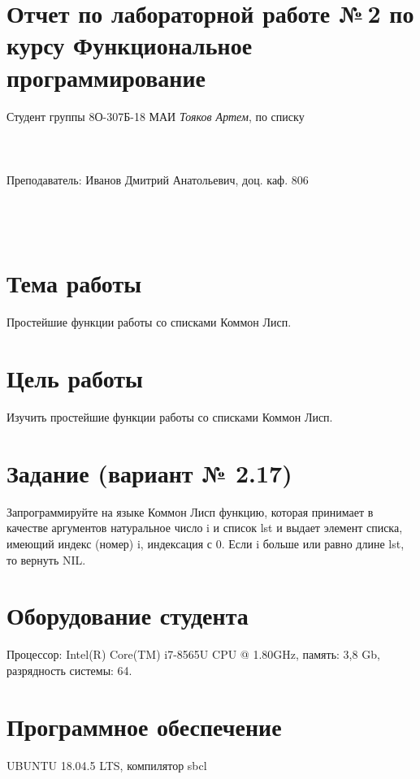 \documentclass[12pt]{article}
\begin{document}
\section*{Отчет по лабораторной работе №\,2 
по курсу \guillemotleft  Функциональное программирование\guillemotright}
\begin{flushright}
Студент группы 8О-307Б-18 МАИ \textit{Тояков Артем},  по списку \\
 \\
 \\
\ \\
Преподаватель: Иванов Дмитрий Анатольевич, доц. каф. 806 \\
 \\
 \\
 \\

\end{flushright}

\section{Тема работы}
Простейшие функции работы со списками Коммон Лисп.

\section{Цель работы}
Изучить  простейшие функции работы со списками Коммон Лисп.

\section{Задание (вариант № 2.17)}
Запрограммируйте на языке Коммон Лисп функцию, которая принимает в качестве аргументов натуральное число i и список lst и выдает элемент списка, имеющий индекс (номер) i, индексация с 0. Если i больше или равно длине lst, то вернуть NIL.

\section{Оборудование студента}
Процессор: Intel(R) Core(TM) i7-8565U CPU @ 1.80GHz, память: 3,8 Gb, разрядность системы: 64.

\section{Программное обеспечение}
UBUNTU 18.04.5 LTS, компилятор sbcl
\end{document}
